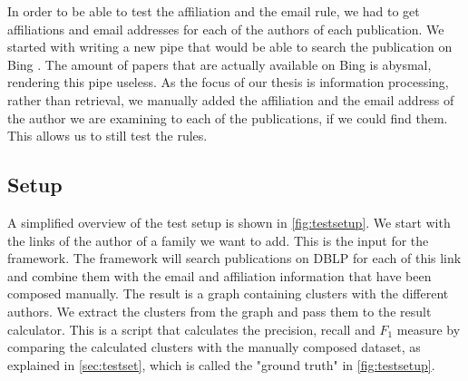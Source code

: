 In order to be able to test the affiliation and the email rule, we had to get affiliations and email addresses for each of the authors of each publication. We started with writing a new pipe that would be able to search the publication on Bing \cite{bing}. The amount of papers that are actually available on Bing is abysmal, rendering this pipe useless. As the focus of our thesis is information processing, rather than retrieval, we manually added the affiliation and the email address of the author we are examining to each of the publications, if we could find them. This allows us to still test the rules.

\subsection{Setup}

A simplified overview of the test setup is shown in \autoref{fig:testsetup}. We start with the links of the author of a family we want to add. This is the input for the framework. The framework will search publications on DBLP for each of this link and combine them with the email and affiliation information that have been composed manually. The result is a graph containing clusters with the different authors. We extract the clusters from the graph and pass them to the result calculator. This is a script that calculates the precision, recall and $F_{1}$ measure by comparing the calculated clusters with the manually composed dataset, as explained in \autoref{sec:testset}, which is called the "ground truth" in \autoref{fig:testsetup}.

